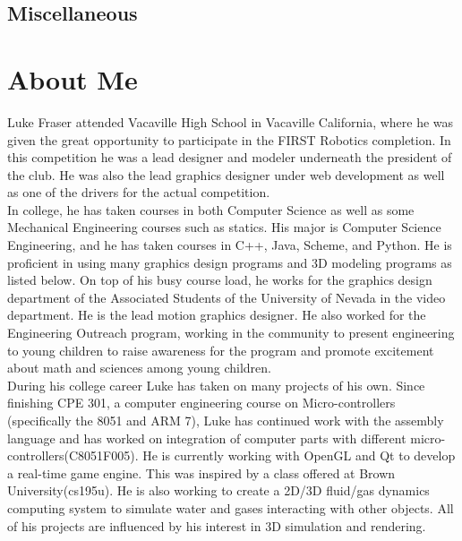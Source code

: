 \documentclass[11pt,a4paper,sans]{moderncv}        %
\begin{document}
\subsection{Miscellaneous}


\section{About Me}
Luke Fraser attended Vacaville High School in Vacaville California, where he was given the great opportunity to participate in the FIRST Robotics completion. In this competition he was a lead designer and modeler underneath the president of the club. He was also the lead graphics designer under web development as well as one of the drivers for the actual competition. \\

In college, he has taken courses in both Computer Science as well as some Mechanical Engineering courses such as statics. His major is Computer Science Engineering, and he has taken courses in C++,  Java, Scheme, and Python. He is proficient in using many graphics design programs and 3D modeling programs as listed below. On top of his busy course load, he works for the graphics design department of the Associated Students of the University of Nevada in the video department. He is the lead motion graphics designer. He also worked for the Engineering Outreach program, working in the community to present engineering to young children to raise awareness for the program and promote excitement about math and sciences among young children. \\

During his college career Luke has taken on many projects of his own. Since finishing CPE 301, a computer engineering  course  on  Micro-controllers (specifically the 8051 and ARM 7), Luke has continued work with the assembly language and has worked on integration of computer parts with different micro-controllers(C8051F005). He  is  currently working with OpenGL and Qt to develop a real-time game engine. This was inspired by a class offered at Brown University(cs195u). He is also working to create a 2D/3D fluid/gas dynamics computing system to simulate water and gases interacting with other objects. All of his projects are influenced by his interest in 3D simulation and rendering.\\
\end{document}
